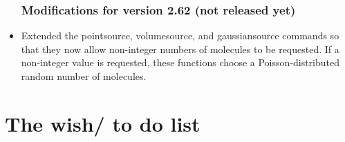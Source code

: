 \documentclass {book}
\begin{document}
\begin{itemize}
\subsection*{Modifications for version 2.62 (not released yet)}
\item Extended the pointsource, volumesource, and gaussiansource commands so that they now allow non-integer numbers of molecules to be requested. If a non-integer value is requested, these functions choose a Poisson-distributed random number of molecules.

\end{itemize}


\chapter{The wish/ to do list}
\end{document}
